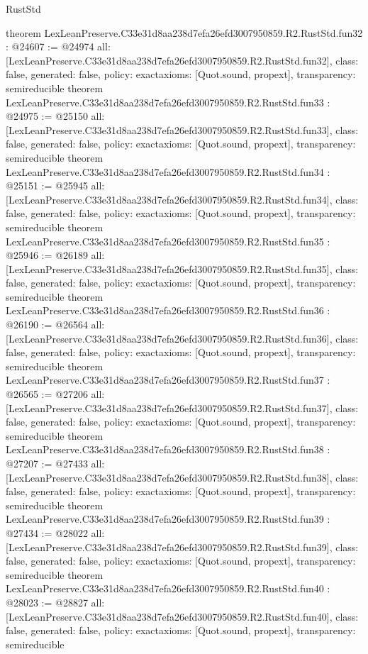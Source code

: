 \begin{lexlean}{RustStd}
\begin{coremodule}
{}
theorem LexLeanPreserve.C33e31d8aa238d7efa26efd3007950859.R2.RustStd.fun32 : @24607 := @24974 {
  all: [LexLeanPreserve.C33e31d8aa238d7efa26efd3007950859.R2.RustStd.fun32],
  class: false,
  generated: false,
  policy: exact{axioms: [Quot.sound, propext]},
  transparency: semireducible
}
theorem LexLeanPreserve.C33e31d8aa238d7efa26efd3007950859.R2.RustStd.fun33 : @24975 := @25150 {
  all: [LexLeanPreserve.C33e31d8aa238d7efa26efd3007950859.R2.RustStd.fun33],
  class: false,
  generated: false,
  policy: exact{axioms: [Quot.sound, propext]},
  transparency: semireducible
}
theorem LexLeanPreserve.C33e31d8aa238d7efa26efd3007950859.R2.RustStd.fun34 : @25151 := @25945 {
  all: [LexLeanPreserve.C33e31d8aa238d7efa26efd3007950859.R2.RustStd.fun34],
  class: false,
  generated: false,
  policy: exact{axioms: [Quot.sound, propext]},
  transparency: semireducible
}
theorem LexLeanPreserve.C33e31d8aa238d7efa26efd3007950859.R2.RustStd.fun35 : @25946 := @26189 {
  all: [LexLeanPreserve.C33e31d8aa238d7efa26efd3007950859.R2.RustStd.fun35],
  class: false,
  generated: false,
  policy: exact{axioms: [Quot.sound, propext]},
  transparency: semireducible
}
theorem LexLeanPreserve.C33e31d8aa238d7efa26efd3007950859.R2.RustStd.fun36 : @26190 := @26564 {
  all: [LexLeanPreserve.C33e31d8aa238d7efa26efd3007950859.R2.RustStd.fun36],
  class: false,
  generated: false,
  policy: exact{axioms: [Quot.sound, propext]},
  transparency: semireducible
}
theorem LexLeanPreserve.C33e31d8aa238d7efa26efd3007950859.R2.RustStd.fun37 : @26565 := @27206 {
  all: [LexLeanPreserve.C33e31d8aa238d7efa26efd3007950859.R2.RustStd.fun37],
  class: false,
  generated: false,
  policy: exact{axioms: [Quot.sound, propext]},
  transparency: semireducible
}
theorem LexLeanPreserve.C33e31d8aa238d7efa26efd3007950859.R2.RustStd.fun38 : @27207 := @27433 {
  all: [LexLeanPreserve.C33e31d8aa238d7efa26efd3007950859.R2.RustStd.fun38],
  class: false,
  generated: false,
  policy: exact{axioms: [Quot.sound, propext]},
  transparency: semireducible
}
theorem LexLeanPreserve.C33e31d8aa238d7efa26efd3007950859.R2.RustStd.fun39 : @27434 := @28022 {
  all: [LexLeanPreserve.C33e31d8aa238d7efa26efd3007950859.R2.RustStd.fun39],
  class: false,
  generated: false,
  policy: exact{axioms: [Quot.sound, propext]},
  transparency: semireducible
}
theorem LexLeanPreserve.C33e31d8aa238d7efa26efd3007950859.R2.RustStd.fun40 : @28023 := @28827 {
  all: [LexLeanPreserve.C33e31d8aa238d7efa26efd3007950859.R2.RustStd.fun40],
  class: false,
  generated: false,
  policy: exact{axioms: [Quot.sound, propext]},
  transparency: semireducible
}
\end{coremodule}
\end{lexlean}
